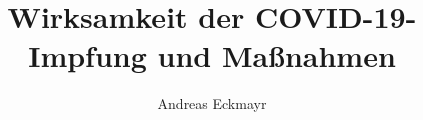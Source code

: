 \documentclass[bachelor,german,smartquotes]{hgbthesis}
\title{Wirksamkeit der COVID-19-Impfung und Maßnahmen}
\author{Andreas Eckmayr}
\begin{document}

\frontmatter                    %

\maketitle
\tableofcontents

		
			

\mainmatter          %






\appendix                                            %




\MakeBibliography                        %



\end{document}
